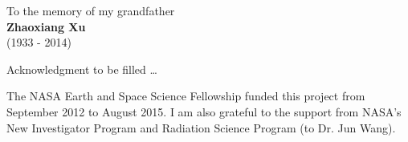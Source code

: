 
\begin{dedication}
  \begin{center}
  \vskip1in
  To the memory of my grandfather \\
  \vskip0.2in
  \textbf{Zhaoxiang Xu} \\
  (1933 \-- 2014)
  \end{center}
\end{dedication}

\begin{acknowledgments}
  Acknowledgment to be filled \ldots
\end{acknowledgments}

\begin{grantinfo}
  The NASA Earth and Space Science Fellowship funded this project from September
  2012 to August 2015. I am also grateful to the support
  from NASA's New Investigator Program and Radiation Science Program
  (to Dr. Jun Wang).
\end{grantinfo}
